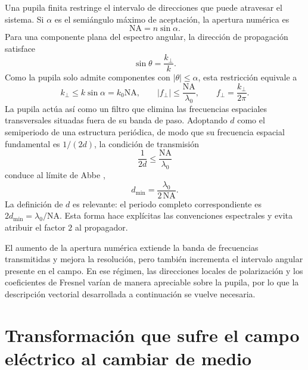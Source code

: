 Una pupila finita restringe el intervalo de direcciones que puede atravesar el
sistema. Si \(\alpha\) es el semiángulo máximo de aceptación, la apertura
numérica es \cite{bornwolf1999}
\begin{equation}
\mathrm{NA}=n\sin\alpha.
\label{eq:def_NA}
\end{equation}
Para una componente plana del espectro angular, la dirección de propagación
satisface
\begin{equation}
\sin\theta
=
\frac{k_\perp}{k}.
\end{equation}
Como la pupila solo admite componentes con \(\lvert\theta\rvert\leq\alpha\),
esta restricción equivale a
\begin{equation}
k_\perp\leq k\sin\alpha=k_0\mathrm{NA},
\qquad
\lvert f_\perp\rvert
\leq
\frac{\mathrm{NA}}{\lambda_0},
\qquad
f_\perp=\frac{k_\perp}{2\pi}.
\label{eq:pupil_spatial_frequency_cutoff}
\end{equation}
La pupila actúa así como un filtro que elimina las frecuencias espaciales
transversales situadas fuera de su banda de paso. Adoptando \(d\) como el
semiperiodo de una estructura periódica, de modo que su frecuencia espacial
fundamental es \(1/(2d)\), la condición de transmisión
\begin{equation}
\frac{1}{2d}
\leq
\frac{\mathrm{NA}}{\lambda_0}
\end{equation}
conduce al límite de Abbe \cite{Abbe1873},
\begin{equation}
d_{\min}
=
\frac{\lambda_0}{2\,\mathrm{NA}}.
\label{eq:abbe_resolution_limit}
\end{equation}
La definición de \(d\) es relevante: el periodo completo correspondiente es
\(2d_{\min}=\lambda_0/\mathrm{NA}\). Esta forma hace explícitas las
convenciones espectrales y evita atribuir el factor \(2\) al propagador.

El aumento de la apertura numérica extiende la banda de frecuencias
transmitidas y mejora la resolución, pero también incrementa el intervalo
angular presente en el campo. En ese régimen, las direcciones locales de
polarización y los coeficientes de Fresnel varían de manera apreciable sobre
la pupila, por lo que la descripción vectorial desarrollada a continuación
se vuelve necesaria.

\section{Transformación que sufre el campo eléctrico al cambiar de medio} 


